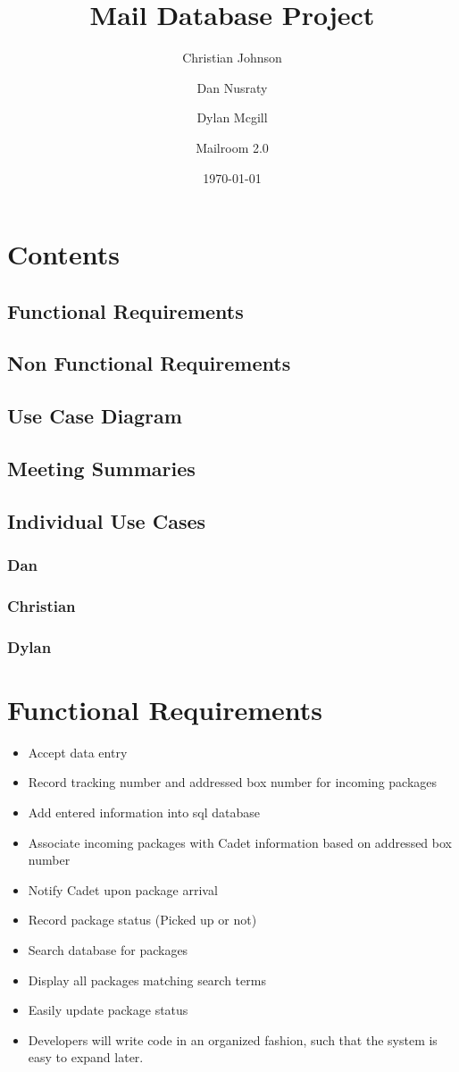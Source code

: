 \documentclass[11pt]{article}
\author{Christian Johnson\and Dan Nusraty\and Dylan Mcgill\and\newline Mailroom 2.0}
\date{\today}
\title{Mail Database Project}
\begin{document}
\maketitle
\section{Contents}
\label{sec:orgec19e59}
\subsection{Functional Requirements}
\label{sec:org3a002d0}
\subsection{Non Functional Requirements}
\label{sec:orgaca0829}
\subsection{Use Case Diagram}
\label{sec:org59bcac8}
\subsection{Meeting Summaries}
\label{sec:org3159ffc}
\subsection{Individual Use Cases}
\label{sec:org683ef4c}
\subsubsection{Dan}
\label{sec:org0db10bf}
\subsubsection{Christian}
\label{sec:org7781afb}
\subsubsection{Dylan}
\label{sec:org080ec2a}
\clearpage
\section*{Functional Requirements}
\label{sec:orgb8b3089}
\begin{itemize}
\item Accept data entry
\item Record tracking number and addressed box number for incoming packages
\item Add entered information into sql database
\item Associate incoming packages with Cadet information based on addressed box number
\item Notify Cadet upon package arrival
\item Record package status (Picked up or not)
\item Search database for packages
\item Display all packages matching search terms
\item Easily update package status
\item Developers will write code in an organized fashion, such that the system is easy to expand later.
\end{itemize}
\end{document}

